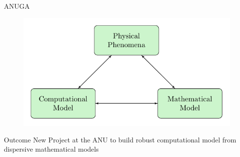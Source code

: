 \documentclass[pdf]{beamer}
\begin{document}
\begin{frame}{ANUGA}
	\begin{figure}
		\includegraphics[width=\textwidth]{./Pics/ModelDiagrams/FlowChartHighAllG.pdf}
	\end{figure}
\end{frame}

\begin{frame}{Outcome}
 New Project at the ANU to build robust computational model from dispersive mathematical models
\end{frame}
\end{document}
